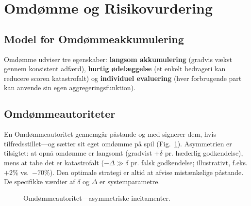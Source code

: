 \documentclass[11pt,a4paper,twocolumn]{article}
\begin{document}
\section{Omdømme og Risikovurdering}

\subsection{Model for Omdømmeakkumulering}

Omdømme udviser tre egenskaber: \textbf{langsom akkumulering} (gradvis vækst gennem konsistent adfærd), \textbf{hurtig ødelæggelse} (et enkelt bedrageri kan reducere scoren katastrofalt) og \textbf{individuel evaluering} (hver forbrugende part kan anvende sin egen aggregeringsfunktion).

\subsection{Omdømmeautoriteter}

En Omdømmeautoritet gennemgår påstande og med-signerer dem, hvis tilfredsstillet---og sætter sit eget omdømme på spil (Fig.~\ref{fig:authority}). Asymmetrien er tilsigtet: at opnå omdømme er langsomt (gradvist $+\delta$ pr. hæderlig godkendelse), mens at tabe det er katastrofalt ($-\Delta \gg \delta$ pr. falsk godkendelse; illustrativt, f.eks. $+2\%$ vs.\ $-70\%$). Den optimale strategi er altid at afvise mistænkelige påstande. De specifikke værdier af $\delta$ og $\Delta$ er systemparametre.

\begin{figure}[ht]
\centering
{}
\caption{Omdømmeautoritet---asymmetriske incitamenter.}
\label{fig:authority}
\end{figure}
\end{document}
